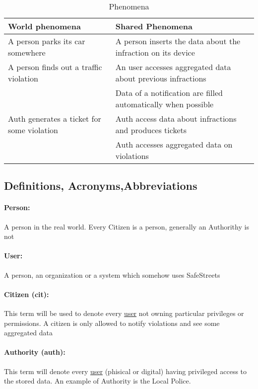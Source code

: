 \documentclass{article}
\begin{document}
		\begin{table}[H]
			\begin{center}
				\caption{Phenomena}
				\small
				\label{Phenomena}
				\begin{tabular}{|p{6cm}|p{5.5cm}|}
					\hline
					\textbf{World phenomena}&\textbf{Shared Phenomena}\\
					\hline
					A person parks its car somewhere&A person inserts the data about the infraction on its device\\
					A person finds out a traffic violation&An user accesses aggregated data about previous infractions\\
						&Data of a notification are filled automatically when possible\\
					\hline
					Auth generates a ticket for some violation&Auth access data about infractions and produces tickets\\
					&Auth accesses aggregated data on violations\\
					\hline
				\end{tabular}
			\end{center}
		\end{table}
		
	\subsection{Definitions, Acronyms,Abbreviations} \label{definitions}
		\paragraph{Person:}A person in the real world. Every Citizen is a person, generally an Authorithy is not
		\paragraph{User:}A person, an organization or a system which somehow uses SafeStreets
		\paragraph{Citizen (cit):} This term will be used to denote every \underline{user} not owning particular privileges or permissions. A citizen is only allowed to notify violations and see some aggregated data
		\paragraph{Authority (auth):} This term will denote every \underline{user} (phisical or digital) having privileged access to the stored data. An example of Authority is the Local Police.
\end{document}
